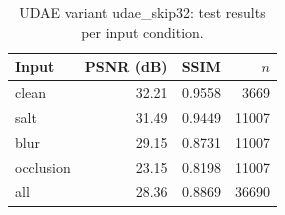 \begin{table}[t]
\centering
\caption{UDAE variant udae_skip32: test results per input condition.}
\label{tab:task1_by_type}
\begin{tabular}{lrrr}
\toprule
Input & PSNR (dB) & SSIM & $n$ \\
\midrule
clean & 32.21 & 0.9558 & 3669 \\
salt & 31.49 & 0.9449 & 11007 \\
blur & 29.15 & 0.8731 & 11007 \\
occlusion & 23.15 & 0.8198 & 11007 \\
all & 28.36 & 0.8869 & 36690 \\
\bottomrule
\end{tabular}
\end{table}

